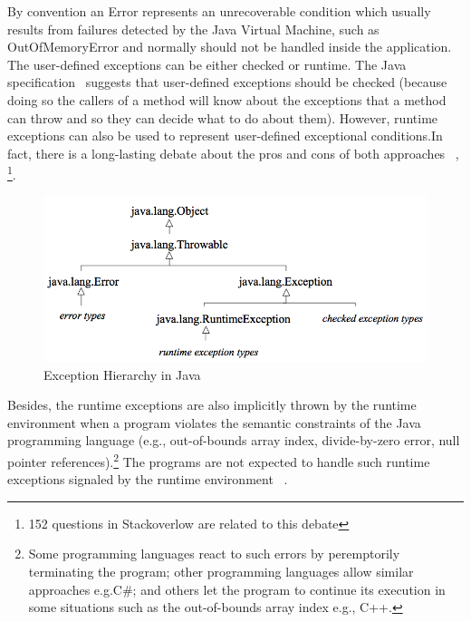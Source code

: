 \documentclass[conference]{IEEEtran}
\begin{document}
By convention an Error represents an unrecoverable condition which usually results
from failures detected by the Java Virtual Machine, such as OutOfMemoryError and
normally should not be handled inside the application. The user-defined exceptions 
can be either checked or runtime. The Java specification~\cite{gosling2000java} 
suggests that user-defined exceptions should be checked (because doing so 
the callers of a method will know about the exceptions that a method can throw and so 
they can decide what to do about them). However, runtime exceptions can also be 
used to represent user-defined exceptional conditions.In fact, there is a long-lasting debate 
about the pros and cons of both approaches ~\cite{javatut,stackoverlow,debate},
\footnote{152 questions in Stackoverlow are related to this debate}.


\begin{figure} \centering \includegraphics[width=\hsize]{new2_hierarchy.png}
  \caption{Exception Hierarchy in Java} \label{fig:exchier} \end{figure}


Besides, the runtime exceptions are also implicitly thrown by the runtime environment when a program violates 
the semantic constraints of the Java programming language (e.g., out-of-bounds array index, divide-by-zero 
error, null pointer references).\footnote{Some programming languages react to such errors by peremptorily terminating the program; 
other programming languages allow similar approaches e.g.C\#; and others let the program to continue
 its execution in some situations such as the out-of-bounds array index e.g., C++. }  
The programs are not expected to handle such runtime exceptions signaled by the runtime environment ~\cite{gosling2000java}. 

\end{document}
